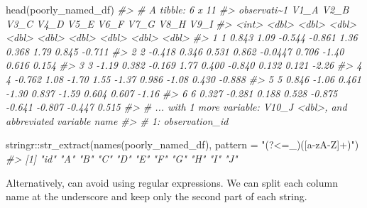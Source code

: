 \documentclass[
  12pt,
]{book}
\newenvironment{Shaded}{\begin{snugshade}}{\end{snugshade}}
\newcommand{\AttributeTok}[1]{\textcolor[rgb]{0.77,0.63,0.00}{#1}}
\newcommand{\CommentTok}[1]{\textcolor[rgb]{0.56,0.35,0.01}{\textit{#1}}}
\newcommand{\FunctionTok}[1]{\textcolor[rgb]{0.00,0.00,0.00}{#1}}
\newcommand{\NormalTok}[1]{#1}
\newcommand{\SpecialCharTok}[1]{\textcolor[rgb]{0.00,0.00,0.00}{#1}}
\newcommand{\StringTok}[1]{\textcolor[rgb]{0.31,0.60,0.02}{#1}}
\begin{document}
\begin{Shaded}
\begin{Highlighting}[]
\FunctionTok{head}\NormalTok{(poorly\_named\_df)}
\CommentTok{\#\textgreater{} \# A tibble: 6 x 11}
\CommentTok{\#\textgreater{}   observati\textasciitilde{}1   V1\_A   V2\_B   V3\_C   V4\_D    V5\_E   V6\_F   V7\_G   V8\_H   V9\_I}
\CommentTok{\#\textgreater{}         \textless{}int\textgreater{}  \textless{}dbl\textgreater{}  \textless{}dbl\textgreater{}  \textless{}dbl\textgreater{}  \textless{}dbl\textgreater{}   \textless{}dbl\textgreater{}  \textless{}dbl\textgreater{}  \textless{}dbl\textgreater{}  \textless{}dbl\textgreater{}  \textless{}dbl\textgreater{}}
\CommentTok{\#\textgreater{} 1           1  0.843  1.09  {-}0.544 {-}0.861  1.36    0.368  1.79   0.845 {-}0.711}
\CommentTok{\#\textgreater{} 2           2 {-}0.418  0.346  0.531  0.862 {-}0.0447  0.706 {-}1.40   0.616  0.154}
\CommentTok{\#\textgreater{} 3           3 {-}1.19   0.382 {-}0.169  1.77   0.400  {-}0.840  0.132  0.121 {-}2.26 }
\CommentTok{\#\textgreater{} 4           4 {-}0.762  1.08  {-}1.70   1.55  {-}1.37    0.986 {-}1.08   0.430 {-}0.888}
\CommentTok{\#\textgreater{} 5           5  0.846 {-}1.06   0.461 {-}1.30   0.837  {-}1.59   0.604  0.607 {-}1.16 }
\CommentTok{\#\textgreater{} 6           6  0.327 {-}0.281  0.188  0.528 {-}0.875  {-}0.641 {-}0.807 {-}0.447  0.515}
\CommentTok{\#\textgreater{} \# ... with 1 more variable: V10\_J \textless{}dbl\textgreater{}, and abbreviated variable name}
\CommentTok{\#\textgreater{} \#   1: observation\_id}
\end{Highlighting}
\end{Shaded}

\begin{Shaded}
\begin{Highlighting}[]
\NormalTok{stringr}\SpecialCharTok{::}\FunctionTok{str\_extract}\NormalTok{(}\FunctionTok{names}\NormalTok{(poorly\_named\_df), }\AttributeTok{pattern =} \StringTok{"(?\textless{}=\_)([a{-}zA{-}Z]+)"}\NormalTok{)}
\CommentTok{\#\textgreater{}  [1] "id" "A"  "B"  "C"  "D"  "E"  "F"  "G"  "H"  "I"  "J"}
\end{Highlighting}
\end{Shaded}

Alternatively, can avoid using regular expressions. We can split each column name at the underscore and keep only the second part of each string.
\end{document}
